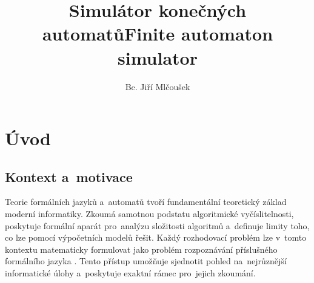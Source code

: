 \documentclass[
  master,
  program=ainfvs,
  printversion,
  figures=false,
  tables=false,
  glossaries,
  index
]{kidiplom}
\title{Simulátor konečných automatů}
\title[english]{Finite automaton simulator}
\author{Bc. Jiří Mlčoušek}
\begin{document}
\maketitle



\section{Úvod}

\subsection{Kontext a~motivace}
Teorie formálních jazyků a~automatů tvoří fundamentální teoretický základ moderní informatiky. Zkoumá samotnou podstatu algoritmické vyčíslitelnosti, poskytuje formální aparát pro~analýzu složitosti algoritmů a~definuje limity toho, co lze pomocí výpočetních modelů řešit. Každý rozhodovací problém \cite[kapitola~6.1]{jancar_ti} lze v~tomto kontextu matematicky formulovat jako problém rozpoznávání příslušného formálního jazyka \cite[kapitola~1]{osicka_sloz} \cite[kapitola~6.2]{jancar_ti}. Tento přístup umožňuje sjednotit pohled na~nejrůznější informatické úlohy a~poskytuje exaktní rámec pro~jejich zkoumání.
\end{document}
